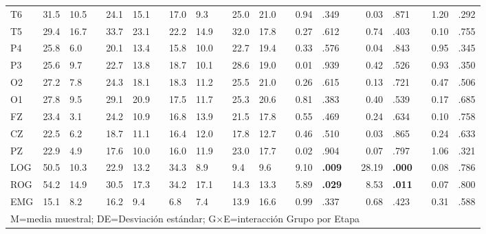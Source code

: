 \documentclass[12pt,letterpaper]{book}
\begin{document}
{\begin{table}
\begin{small}
\begin{tabular}{lllllllllllllrllrllrl}
T6  & 31.5 & 10.5 &  & 24.1 & 15.1 &  & 17.0 & 9.3  &  & 25.0 & 21.0 &  & 0.94 & .349 &  & 0.03  & .871 &  & 1.20 & .292 \\
T5  & 29.4 & 16.7 &  & 33.7 & 23.1 &  & 22.2 & 14.9 &  & 32.0 & 17.8 &  & 0.27 & .612 &  & 0.74  & .403 &  & 0.10 & .755 \\
P4  & 25.8 & 6.0  &  & 20.1 & 13.4 &  & 15.8 & 10.0 &  & 22.7 & 19.4 &  & 0.33 & .576 &  & 0.04  & .843 &  & 0.95 & .345 \\
P3  & 25.6 & 9.7  &  & 22.7 & 13.8 &  & 18.7 & 10.1 &  & 28.6 & 19.0 &  & 0.01 & .939 &  & 0.42  & .526 &  & 0.93 & .350 \\
O2  & 27.2 & 7.8  &  & 24.3 & 18.1 &  & 18.3 & 11.2 &  & 25.5 & 21.0 &  & 0.26 & .615 &  & 0.13  & .721 &  & 0.47 & .506 \\
O1  & 27.8 & 9.5  &  & 29.1 & 20.9 &  & 17.5 & 11.7 &  & 25.3 & 20.6 &  & 0.81 & .383 &  & 0.40  & .539 &  & 0.17 & .685 \\
FZ  & 23.4 & 3.1  &  & 24.2 & 10.9 &  & 16.8 & 13.9 &  & 21.5 & 17.8 &  & 0.55 & .469 &  & 0.24  & .634 &  & 0.10 & .758 \\
CZ  & 22.5 & 6.2  &  & 18.7 & 11.1 &  & 16.4 & 12.0 &  & 17.8 & 12.7 &  & 0.46 & .510 &  & 0.03  & .865 &  & 0.24 & .633 \\
PZ  & 22.9 & 4.9  &  & 17.6 & 10.0 &  & 16.0 & 11.9 &  & 23.0 & 17.7 &  & 0.02 & .904 &  & 0.07  & .797 &  & 1.06 & .321 \\
LOG & 50.5 & 10.3 &  & 22.9 & 13.2 &  & 34.3 & 8.9  &  & 9.4  & 9.6  &  & 9.10 &\bf .009 &  & 28.19 &\bf .000 &  & 0.08 & .786 \\
ROG & 54.2 & 14.9 &  & 30.5 & 17.3 &  & 34.2 & 17.1 &  & 14.3 & 13.3 &  & 5.89 &\bf .029 &  & 8.53  &\bf .011 &  & 0.07 & .800 \\
EMG & 15.1 & 8.2  &  & 16.2 & 9.4  &  & 6.8  & 7.4  &  & 13.9 & 16.6 &  & 0.99 & .337 &  & 0.68  & .423 &  & 0.31 & .588 \\
\bottomrule 
\multicolumn{20}{l}{M=media muestral; DE=Desviación estándar; G$\times$E=interacción Grupo por Etapa}
\end{tabular}
\end{small}
\end{table}
}
\end{document}
